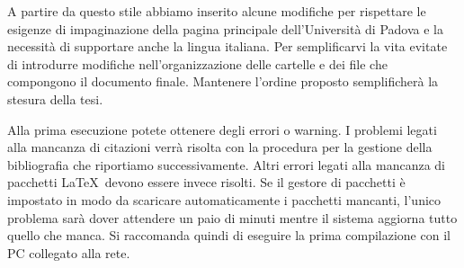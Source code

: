 \documentclass[paper=a4, fontsize=11pt]{scrartcl}	%
\numberwithin{equation}{section}		%
\numberwithin{figure}{section}			%
\numberwithin{table}{section}				%
\begin{document}
A partire da questo stile abbiamo inserito alcune modifiche per rispettare le esigenze di impaginazione della pagina principale dell'Universit\`a di Padova e la necessit\`a di supportare anche la lingua italiana. 
Per semplificarvi la vita evitate di introdurre modifiche nell'organizzazione delle cartelle e dei file che compongono il documento finale. 
Mantenere l'ordine proposto semplificher\`a la stesura della tesi.

Alla prima esecuzione potete ottenere degli errori o warning. 
I problemi legati alla mancanza di citazioni verr\`a risolta con la procedura per la gestione della bibliografia che riportiamo successivamente. 
Altri errori legati alla mancanza di pacchetti \LaTeX~devono essere invece risolti. 
Se il gestore di pacchetti \`e impostato in modo da scaricare automaticamente i pacchetti mancanti, l'unico problema sar\`a dover attendere un paio di minuti mentre il sistema aggiorna tutto quello che manca. 
Si raccomanda quindi di eseguire la prima compilazione con il PC collegato alla rete.
 
\end{document}
